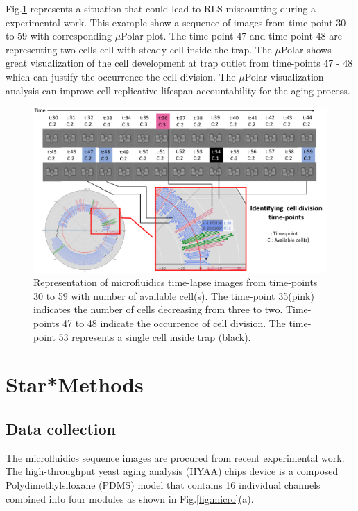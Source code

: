 \documentclass[conference]{IEEEtran}
\begin{document}
Fig.\ref{fig:division} represents a situation that could lead to RLS miscounting during a  experimental work. This example show a sequence of images from time-point 30 to 59 with corresponding $\mu$Polar plot. The time-point 47 and time-point 48 are representing two cells cell with steady cell inside the trap. The $\mu$Polar shows great visualization of the cell development at trap outlet from time-points 47 - 48 which can justify the occurrence the cell division. The $\mu$Polar visualization analysis can improve cell replicative lifespan accountability for the aging process.    


\begin{figure}
\centering
\includegraphics[width=\textwidth,height=10 cm]{Patterns/division.pdf}
\caption{ Representation of microfluidics time-lapse images from time-points 30 to 59 with number of available cell(s). The time-point 35(pink) indicates the number of cells decreasing from three to two. Time-points 47 to 48 indicate the occurrence of cell division. The time-point 53 represents a single cell inside trap (black).}
\label{fig:division}
\end{figure}


\section{Star*Methods}

\subsection*{Data collection}
The microfluidics sequence images are procured from \cite{ref13} recent experimental work. The high-throughput yeast aging analysis (HYAA) chips device is a composed Polydimethylsiloxane (PDMS) model that contains 16 individual channels combined into four modules as shown in Fig.\ref{fig:micro}(a).
\end{document}
